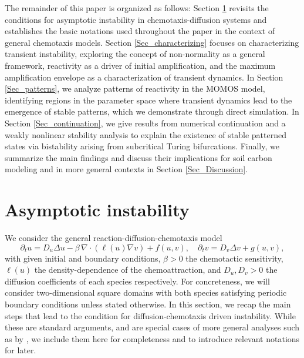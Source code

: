 \documentclass{article}
\begin{document}
The remainder of this paper is organized as follows: Section \ref{Sec_app_chem_insta} revisits the conditions for asymptotic instability in chemotaxis-diffusion systems and establishes the basic notations used throughout the paper in the context of general chemotaxis models. Section \ref{Sec_characterizing} focuses on characterizing transient instability, exploring the concept of non-normality as a general framework, reactivity as a driver of initial amplification, and the maximum amplification envelope as a characterization of transient dynamics. In Section \ref{Sec_patterns}, we analyze patterns of reactivity in the MOMOS model, identifying regions in the parameter space where transient dynamics lead to the emergence of stable patterns, {which we demonstrate through direct simulation}. {In Section \ref{Sec_continuation}, we give results from numerical continuation and a weakly nonlinear stability analysis to explain the existence of stable patterned states via bistability arising from subcritical Turing bifurcations.} Finally, we summarize the main findings and discuss their implications for soil carbon modeling {and in more general contexts} in Section \ref{Sec_Discussion}.
   








\section{Asymptotic  instability}
\label{Sec_app_chem_insta}

We consider the general reaction-diffusion-chemotaxis model
 \begin{equation}
\label{eq:general_hu}  
\partial_t u = D_u \Delta u -\beta \, \nabla \cdot( \ell(u) \nabla v) + f(u,v), \quad  \partial_t v = D_v \Delta v + g(u,v),
\end{equation}
with given initial and boundary conditions, $\beta>0$ the chemotactic sensitivity, {$\ell(u)$ the density-dependence of the chemoattraction,} and $D_u, D_v>0$ the diffusion coefficients of each species respectively. {For concreteness, we will consider two-dimensional square domains with both species satisfying periodic boundary conditions unless stated otherwise.} In this section, we recap the main steps that lead to the condition for diffusion-chemotaxis driven instability. While these are standard arguments, and are special cases of more general analyses such as by \cite{ritchie2022turing}, we include them here for completeness and to introduce relevant notations for later. 
\end{document}
